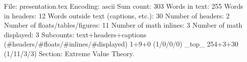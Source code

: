 File: presentation.tex
Encoding: ascii
Sum count: 303
Words in text: 255
Words in headers: 12
Words outside text (captions, etc.): 30
Number of headers: 2
Number of floats/tables/figures: 11
Number of math inlines: 3
Number of math displayed: 3
Subcounts:
  text+headers+captions (#headers/#floats/#inlines/#displayed)
  1+9+0 (1/0/0/0) _top_
  254+3+30 (1/11/3/3) Section: Extreme Value Theory. 

